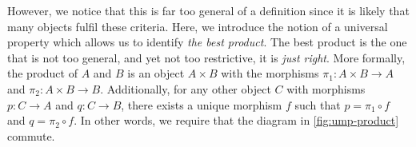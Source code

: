 \documentclass[12pt,twoside,maitrise]{dms}
\theoremstyle{definition}
\numberwithin{equation}{section}
\numberwithin{table}{chapter}
\numberwithin{figure}{chapter}
\begin{document}
However, we notice that this is far too general of a definition since it is
likely that many objects fulfil these criteria. Here, we introduce the notion of
a universal property which allows us to identify \emph{the best product}. The
best product is the one that is not too general, and yet not too restrictive, it
is \emph{just right}. More formally, the product of $A$ and $B$ is an object $A
\times B$ with the morphisms $\pi_1 : A \times B \rightarrow A$ and $\pi_2 : A
\times B \rightarrow B$. Additionally, for any other object $C$ with morphisms
$p : C \rightarrow A$ and $q : C \rightarrow B$, there exists a unique morphism
$f$ such that $p = \pi_1 \circ f$ and $q = \pi_2 \circ f$. In other words, we
require that the diagram in \autoref{fig:ump-product} commute.

\begin{figure}
\centering

\begin{tikzpicture}[x=0.75pt,y=0.75pt,yscale=-1,xscale=1]


\end{tikzpicture}
\end{figure}
\end{document}
